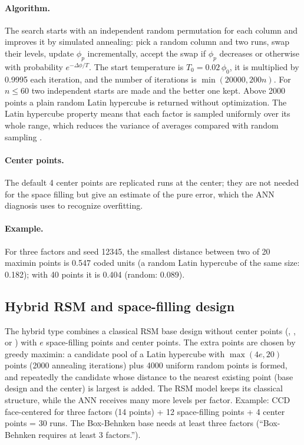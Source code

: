 \paragraph{Algorithm.} The search starts with an independent random permutation for each column and improves it by
simulated annealing: pick a random column and two runs, swap their levels, update $\phi_p$ incrementally, accept the
swap if $\phi_p$ decreases or otherwise with probability $e^{-\Delta\phi/T}$. The start temperature is
$T_0 = 0.02\,\phi_0$, it is multiplied by 0.9995 each iteration, and the number of iterations is
$\min(20000, 200n)$. For $n \le 60$ two independent starts are made and the better one kept. Above 2000 points a
plain random Latin hypercube is returned without optimization. The Latin hypercube property means that each factor
is sampled uniformly over its whole range, which reduces the variance of averages compared with random sampling
\citep{stein1987}.

\paragraph{Center points.} The default 4 center points are replicated runs at the center; they are not needed for
the space filling but give an estimate of the pure error, which the ANN diagnosis uses to recognize overfitting.

\paragraph{Example.} For three factors and seed 12345, the smallest distance between two of 20 maximin points is
0.547 coded units (a random Latin hypercube of the same size: 0.182); with 40 points it is 0.404 (random: 0.089).

\subsection{Hybrid RSM and space-filling design}
The hybrid type combines a classical RSM base design without center points (,
,  or ) with $e$ space-filling points
and center points. The extra points are chosen by greedy maximin: a candidate pool of a Latin hypercube with
$\max(4e, 20)$ points (2000 annealing iterations) plus 4000 uniform random points is formed, and repeatedly the
candidate whose distance to the nearest existing point (base design and the center) is largest is added. The RSM
model keeps its classical structure, while the ANN receives many more levels per factor. Example: CCD
face-centered for three factors (14 points) + 12 space-filling points + 4 center points = 30 runs. The Box-Behnken
base needs at least three factors (``Box-Behnken requires at least 3 factors.'').

